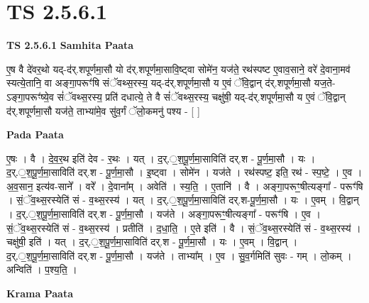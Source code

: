 \documentclass[17pt]{extarticle}
\begin{document}
\section*{ TS 2.5.6.1 }

\textbf{TS 2.5.6.1 } \newline
\textbf{Samhita Paata} \newline

ए॒ष वै दे॑वर॒थो यद्-द॑र्.शपूर्णमा॒सौ यो द॑र्.शपूर्णमा॒सावि॒ष्ट्वा सोमे॑न॒ यज॑ते॒ रथ॑स्पष्ट ए॒वाव॒साने॒ वरे॑ दे॒वाना॒मव॑ स्यत्ये॒तानि॒ वा अङ्गा॒परूꣳ॑षि संॅवथ्स॒रस्य॒ यद्-द॑र्.शपूर्णमा॒सौ य ए॒वं ॅवि॒द्वान् द॑र्.शपूर्णमा॒सौ यज॒ते-ऽङ्गा॒परूꣳ॑ष्ये॒व सं॑ॅवथ्स॒रस्य॒ प्रति॑ दधात्ये॒ ते वै सं॑ॅवथ्स॒रस्य॒ चक्षु॑षी॒ यद्-द॑र्.शपूर्णमा॒सौ य ए॒वं ॅवि॒द्वान् द॑र्.शपूर्णमा॒सौ यज॑ते॒ ताभ्या॑मे॒व सु॑व॒र्गं ॅलो॒कमनु॑ पश्य - [  ] \newline

\textbf{Pada Paata} \newline

ए॒षः । वै । दे॒व॒र॒थ इति॑ देव - र॒थः । यत् । द॒र्.॒श॒पू॒र्ण॒मा॒साविति॑ दर्.श - पू॒र्ण॒मा॒सौ । यः । द॒र्.॒श॒पू॒र्ण॒मा॒साविति॑ दर्.श - पू॒र्ण॒मा॒सौ । इ॒ष्ट्वा । सोमे॑न । यज॑ते । रथ॑स्पष्ट॒ इति॒ रथ॑ - स्प॒ष्टे॒ । ए॒व । अ॒व॒सान॒ इत्य॑व-साने᳚ । वरे᳚ । दे॒वाना᳚म् । अवेति॑ । स्य॒ति॒ । ए॒तानि॑ । वै । अङ्गा॒परूꣳ॒॒षीत्यङ्गा᳚ - परूꣳ॑षि । सं॒ॅव॒थ्स॒रस्येति॑ सं - व॒थ्स॒रस्य॑ । यत् । द॒र्.॒श॒पू॒र्ण॒मा॒साविति॑ दर्.श-पू॒र्ण॒मा॒सौ । यः । ए॒वम् । वि॒द्वान् । द॒र्.॒श॒पू॒र्ण॒मा॒साविति॑ दर्.श - पू॒र्ण॒मा॒सौ । यज॑ते । अङ्गा॒परूꣳ॒॒षीत्यङ्गा᳚ - परूꣳ॑षि । ए॒व । सं॒ॅव॒थ्स॒रस्येति॑ सं - व॒थ्स॒रस्य॑ । प्रतीति॑ । द॒धा॒ति॒ । ए॒ते इति॑ । वै । सं॒ॅव॒थ्स॒रस्येति॑ सं - व॒थ्स॒रस्य॑ । चक्षु॑षी॒ इति॑ । यत् । द॒र्.॒श॒पू॒र्ण॒मा॒साविति॑ दर्.श - पू॒र्ण॒मा॒सौ । यः । ए॒वम् । वि॒द्वान् । द॒र्.॒श॒पू॒र्ण॒मा॒साविति॑ दर्.श - पू॒र्ण॒मा॒सौ । यज॑ते । ताभ्या᳚म् । ए॒व । सु॒व॒र्गमिति॑ सुवः - गम् । लो॒कम् । अन्विति॑ । प॒श्य॒ति॒ ।  \newline


\textbf{Krama Paata} \newline
\end{document}
